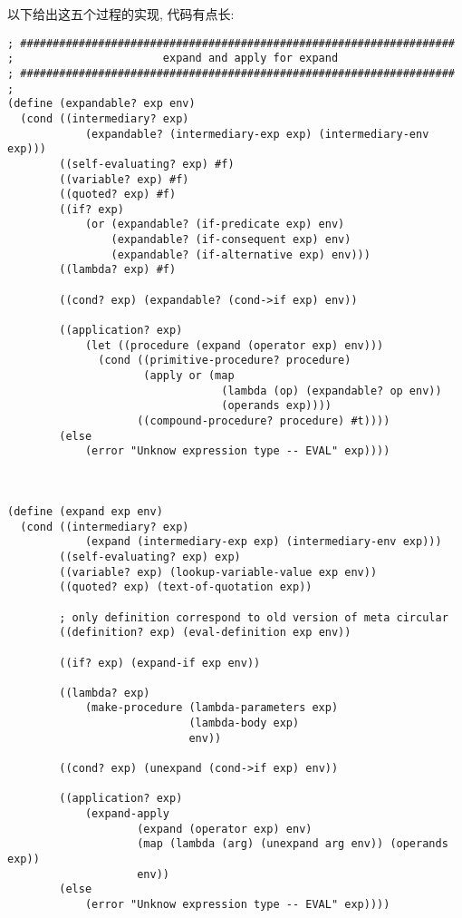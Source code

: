 \documentclass{article}
\begin{document}
\begin{CJK*}{UTF8}{gkai}
以下给出这五个过程的实现, 代码有点长:

\begin{lstlisting}[basicstyle=\scriptsize\ttfamily\bfseries]
; ###################################################################
;                       expand and apply for expand
; ###################################################################
;
(define (expandable? exp env)
  (cond ((intermediary? exp) 
            (expandable? (intermediary-exp exp) (intermediary-env exp)))
        ((self-evaluating? exp) #f)
        ((variable? exp) #f)
        ((quoted? exp) #f)
        ((if? exp) 
            (or (expandable? (if-predicate exp) env)
                (expandable? (if-consequent exp) env)
                (expandable? (if-alternative exp) env)))
        ((lambda? exp) #f)

        ((cond? exp) (expandable? (cond->if exp) env))

        ((application? exp)
            (let ((procedure (expand (operator exp) env)))
              (cond ((primitive-procedure? procedure) 
                     (apply or (map 
                                 (lambda (op) (expandable? op env)) 
                                 (operands exp))))
                    ((compound-procedure? procedure) #t))))
        (else
            (error "Unknow expression type -- EVAL" exp))))



(define (expand exp env)
  (cond ((intermediary? exp) 
            (expand (intermediary-exp exp) (intermediary-env exp)))
        ((self-evaluating? exp) exp)
        ((variable? exp) (lookup-variable-value exp env))
        ((quoted? exp) (text-of-quotation exp))

        ; only definition correspond to old version of meta circular 
        ((definition? exp) (eval-definition exp env))
         
        ((if? exp) (expand-if exp env))
        
        ((lambda? exp)
            (make-procedure (lambda-parameters exp)
                            (lambda-body exp)
                            env))

        ((cond? exp) (unexpand (cond->if exp) env))
 
        ((application? exp)
            (expand-apply    
                    (expand (operator exp) env)
                    (map (lambda (arg) (unexpand arg env)) (operands exp))
                    env))
        (else
            (error "Unknow expression type -- EVAL" exp))))



\end{lstlisting}
\end{CJK*}
\end{document}
